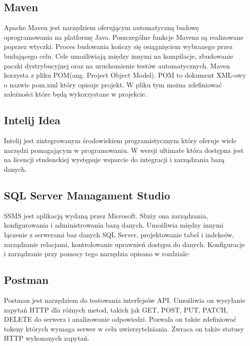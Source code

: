 \subsection{Maven}
Apache Maven jest narzędziem oferującym automatyczną budowę oprogramowania na platformę Java. Poszczególne funkcje Mavena są realizowane poprzez wtyczki. Proces budowania kończy się osiągnięciem wybranego przez budującego celu. Cele umożliwiają między innymi na kompilacje, zbudowanie paczki dystrybucyjnej oraz na uruchomienie testów automatycznych. Maven korzysta z pliku POM(ang. Project Object Model). POM to dokument XML-owy o nazwie pom.xml który opisuje projekt. W pliku tym można zdefiniować zależności które będą wykorzystane w projekcie. 

\subsection{Intelij Idea}
Intelij jest zintegrowanym środowiskiem programistycznym który oferuje wiele narzędzi pomagającym w programowaniu. W wersji ultimate która dostępna jest na licencji studenckiej występuje wsparcie do integracji i zarządzania bazą danych.

\subsection{SQL Server Managament Studio}
SSMS jest aplikacją wydaną przez Microsoft. Służy ona zarządzania, konfigurowania i administrowania bazą danych. Umożliwia między innymi łączenie z serwerami baz danych SQL Server, projektowanie tabel i indeksów, zarządzanie relacjami, kontrolowanie uprawnień dostępu do danych. Konfiguracje i zarządzanie przy pomocy tego narzędzia opisano w rozdziale: \textbf{}

\subsection{Postman}
Postman jest narzędziem do testowania interfejsów API. Umożliwia on wysyłanie zapytań HTTP dla różnych metod, takich jak GET, POST, PUT, PATCH, DELETE do serwera i analizowanie odpowiedzi. Pozwala on także zdefiniować tokeny których wymaga serwer w celu uwierzytelniania. Zwraca on także statusy HTTP wykonanych zapytań.



